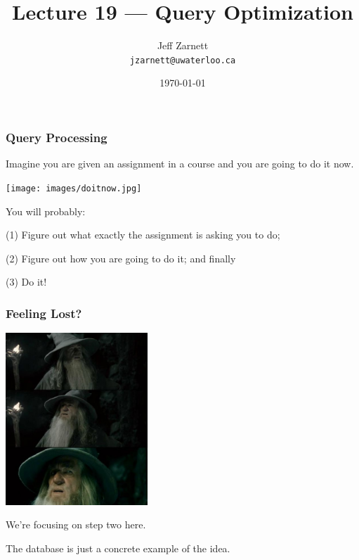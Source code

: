 


\title{Lecture 19 --- Query Optimization}

\author{Jeff Zarnett\\ \small \texttt{jzarnett@uwaterloo.ca}}
\date{\today}




\begin{frame}
  \titlepage

\end{frame}

\begin{frame}
\frametitle{Query Processing}

Imagine you are given an assignment in a course and you are going to do it now. 

\begin{center}
	\texttt{[image: images/doitnow.jpg]}
\end{center}

You will probably: 

(1) Figure out what exactly the assignment is asking you to do; 

(2) Figure out how you are going to do it; and finally 

(3) Do it! 

\end{frame}

\begin{frame}
\frametitle{Feeling Lost?}

\begin{center}
	\includegraphics[width=0.4\textwidth]{images/gandalf.png}
\end{center}

We're focusing on step two here.

The database is just a concrete example of the idea.

\end{frame}


